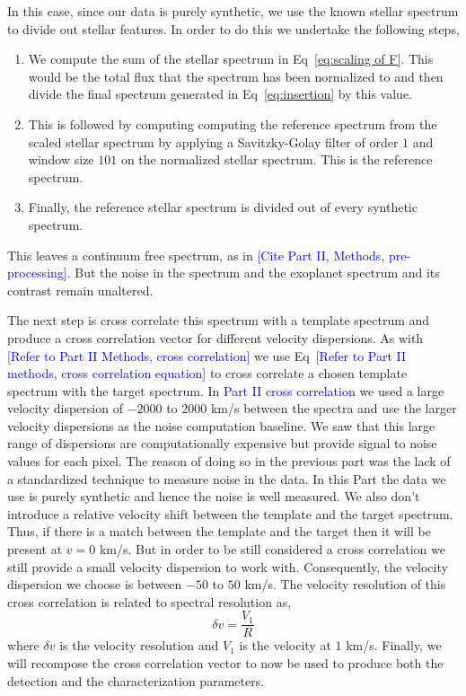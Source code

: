 In this case, since our data is purely synthetic, we use the known stellar spectrum to divide out stellar features.
In order to do this we undertake the following steps,
\begin{enumerate}
    \item We compute the sum of the stellar spectrum in Eq~\ref{eq:scaling of F}. This would be the total flux that the spectrum has been normalized to and then divide the final spectrum generated in Eq~\ref{eq:insertion} by this value.
    \item This is followed by computing computing the reference spectrum from the scaled stellar spectrum by applying a Savitzky-Golay filter of order $1$ and window size $101$ on the normalized stellar spectrum.
    This is the reference spectrum.
    \item Finally, the reference stellar spectrum is divided out of every synthetic spectrum.
\end{enumerate}
This leaves a continuum free spectrum, as in \textcolor{blue}{[Cite Part II, Methods, pre-processing]}.
But the noise in the spectrum and the exoplanet spectrum and its contrast remain unaltered.

The next step is cross correlate this spectrum with a template spectrum and produce a cross correlation vector for different velocity dispersions.
As with \textcolor{blue}{[Refer to Part II Methods, cross correlation]} we use Eq~\textcolor{blue}{[Refer to Part II methods, cross correlation equation]} to cross correlate a chosen template spectrum with the target spectrum.
In \textcolor{blue}{Part II cross correlation} we used a large velocity dispersion of $-2000$ to $2000$ km/s between the spectra and use the larger velocity dispersions as the noise computation baseline.
We saw that this large range of dispersions are computationally expensive but provide signal to noise values for each pixel.
The reason of doing so in the previous part was the lack of a standardized technique to measure noise in the data.
In this Part the data we use is purely synthetic and hence the noise is well measured.
We also don't introduce a relative velocity shift between the template and the target spectrum.
Thus, if there is a match between the template and the target then it will be present at $v=0$ km/s.
But in order to be still considered a cross correlation we still provide a small velocity dispersion to work with.
Consequently, the velocity dispersion we choose is between $-50$ to $50$ km/s.
The velocity resolution of this cross correlation is related to spectral resolution as,
\begin{equation}
    \delta v = \dfrac{V_{1}}{R}
\end{equation}
where $\delta v$ is the velocity resolution and $V_1$ is the velocity at $1$ km/s.
Finally, we will recompose the cross correlation vector to now be used to produce both the detection and the characterization parameters.
